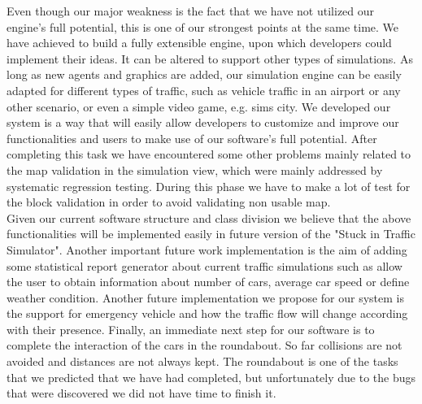 \documentclass[oneside]{article}
\begin{document}
\noindent Even though our major weakness is the fact that we have not utilized our engine's full potential, this is one of our strongest points at the same time. We have achieved to build a fully extensible engine, upon which developers could implement their ideas. It can be altered to support other types of simulations. As long as new agents and graphics are added, our simulation engine can be easily adapted for different types of traffic, such as vehicle traffic in an airport or any other scenario, or even a simple video game, e.g. sims city. We developed our system is a way that will easily allow developers to customize and improve our functionalities and users to make use of our software's full potential. After completing this task we have encountered some other problems mainly related to the map validation in the simulation view, which were mainly addressed by systematic regression testing. During this phase we have to make a lot of test for the block validation in order to avoid validating non usable map. \\

\noindent Given our current software structure and class division we believe that the above functionalities will be implemented easily in future version of the "Stuck in Traffic Simulator". Another important future work implementation is the aim of adding some statistical report generator about current traffic simulations such as allow the user to obtain information about number of cars, average car speed or define weather condition. Another future implementation we propose for our system is the support for emergency vehicle and how the traffic flow will change according with their presence. Finally, an immediate next step for our software is to complete the interaction of the cars in the roundabout. So far collisions are not avoided and distances are not always kept. The roundabout is one of the tasks that we predicted that we have had completed, but unfortunately due to the bugs that were discovered we did not have time to finish it.
\newline
\end{document}
